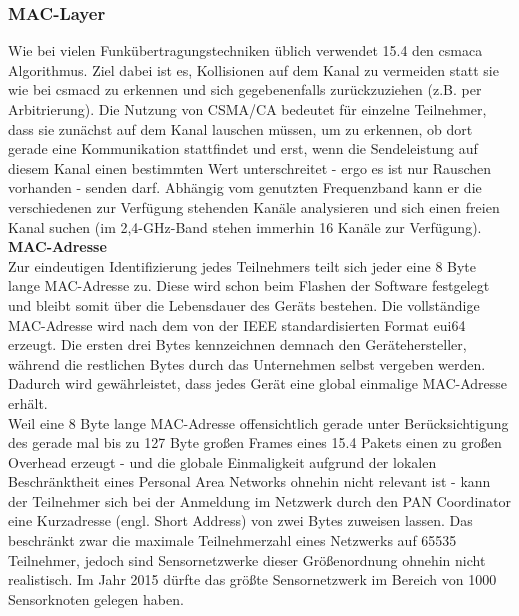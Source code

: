 \subsubsection{MAC-Layer}
Wie bei vielen Funkübertragungstechniken üblich verwendet 15.4 den \ac{csmaca} Algorithmus. Ziel dabei ist es, Kollisionen auf dem Kanal zu vermeiden statt sie wie bei \ac{csmacd} zu erkennen und sich gegebenenfalls zurückzuziehen (z.B. per Arbitrierung). Die Nutzung von CSMA/CA bedeutet für einzelne Teilnehmer, dass sie zunächst auf dem Kanal lauschen müssen, um zu erkennen, ob dort gerade eine Kommunikation stattfindet und erst, wenn die Sendeleistung auf diesem Kanal einen bestimmten Wert unterschreitet - ergo es ist nur Rauschen vorhanden - senden darf. Abhängig vom genutzten Frequenzband kann er die verschiedenen zur Verfügung stehenden Kanäle analysieren und sich einen freien Kanal suchen (im 2,4-GHz-Band stehen immerhin 16 Kanäle zur Verfügung). \\

\textbf{MAC-Adresse}\\
Zur eindeutigen Identifizierung jedes Teilnehmers teilt sich jeder eine 8 Byte lange MAC-Adresse zu. Diese wird schon beim Flashen der Software festgelegt und bleibt somit über die Lebensdauer des Geräts bestehen. Die vollständige MAC-Adresse wird nach dem von der IEEE standardisierten Format \ac{eui64} erzeugt. Die ersten drei Bytes kennzeichnen demnach den Gerätehersteller, während die restlichen Bytes durch das Unternehmen selbst vergeben werden. Dadurch wird gewährleistet, dass jedes Gerät eine global einmalige MAC-Adresse erhält. \\
Weil eine 8 Byte lange MAC-Adresse offensichtlich gerade unter Berücksichtigung des gerade mal bis zu 127 Byte großen Frames eines 15.4 Pakets einen zu großen Overhead erzeugt - und die globale Einmaligkeit aufgrund der lokalen Beschränktheit eines Personal Area Networks ohnehin nicht relevant ist - kann der Teilnehmer sich bei der Anmeldung im Netzwerk durch den PAN Coordinator eine Kurzadresse (engl. Short Address) von zwei Bytes zuweisen lassen. Das beschränkt zwar die maximale Teilnehmerzahl eines Netzwerks auf 65535 Teilnehmer, jedoch sind Sensornetzwerke dieser Größenordnung ohnehin nicht realistisch. Im Jahr 2015 dürfte das größte Sensornetzwerk im Bereich von 1000 Sensorknoten gelegen haben. \cite{schiessleiot} \\

